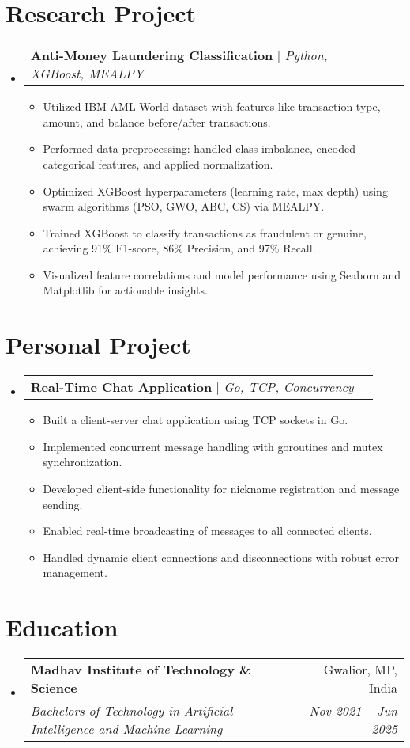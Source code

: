 \documentclass[letterpaper,11pt]{article}
\makeatletter
\newcommand{\resumeItem}[1]{
  \item\small{
    {#1 \vspace{-2pt}}
  }
}
\newcommand{\resumeSubheading}[4]{
  \vspace{-2pt}\item
    \begin{tabular*}{0.97\textwidth}[t]{l@{\extracolsep{\fill}}r}
      \textbf{#1} & #2 \\
      \textit{\small#3} & \textit{\small #4} \\
    \end{tabular*}\vspace{-7pt}
}
\newcommand{\resumeProjectHeading}[2]{
    \item
    \begin{tabular*}{0.97\textwidth}{l@{\extracolsep{\fill}}r}
      \small#1 & #2 \\
    \end{tabular*}\vspace{-7pt}
}
\newcommand{\resumeSubHeadingListStart}{\begin{itemize}[leftmargin=0.15in, label={}]}
\newcommand{\resumeSubHeadingListEnd}{\end{itemize}}
\newcommand{\resumeItemListStart}{\begin{itemize}}
\newcommand{\resumeItemListEnd}{\end{itemize}\vspace{-5pt}}
\makeatother
\begin{document}
\section{Research Project}

\resumeSubHeadingListStart
  \resumeProjectHeading
    {\textbf{Anti-Money Laundering Classification} $|$ \emph{Python, XGBoost, MEALPY}}{}
    \resumeItemListStart
      \resumeItem{Utilized IBM AML-World dataset with features like transaction type, amount, and balance before/after transactions.}
      \resumeItem{Performed data preprocessing: handled class imbalance, encoded categorical features, and applied normalization.}
      \resumeItem{Optimized XGBoost hyperparameters (learning rate, max depth) using swarm algorithms (PSO, GWO, ABC, CS) via MEALPY.}
      \resumeItem{Trained XGBoost to classify transactions as fraudulent or genuine, achieving 91\% F1-score, 86\% Precision, and 97\% Recall.}
      \resumeItem{Visualized feature correlations and model performance using Seaborn and Matplotlib for actionable insights.}
    \resumeItemListEnd
\resumeSubHeadingListEnd

\section{Personal Project}
\resumeSubHeadingListStart
  \resumeProjectHeading
    {\textbf{Real-Time Chat Application} $|$ \emph{Go, TCP, Concurrency}}{}
    \resumeItemListStart
      \resumeItem{Built a client-server chat application using TCP sockets in Go.}
      \resumeItem{Implemented concurrent message handling with goroutines and mutex synchronization.}
      \resumeItem{Developed client-side functionality for nickname registration and message sending.}
      \resumeItem{Enabled real-time broadcasting of messages to all connected clients.}
      \resumeItem{Handled dynamic client connections and disconnections with robust error management.}
    \resumeItemListEnd
\resumeSubHeadingListEnd

\section{Education}
  \resumeSubHeadingListStart
    \resumeSubheading
      {Madhav Institute of Technology \& Science}{Gwalior, MP, India}
        {Bachelors of Technology in Artificial Intelligence and Machine Learning}{Nov 2021 -- Jun 2025}
  \resumeSubHeadingListEnd

\end{document}
